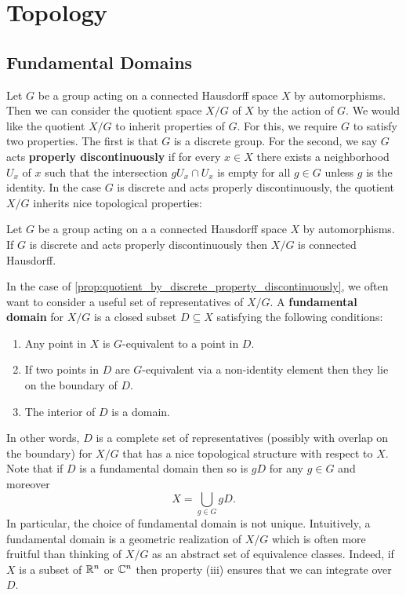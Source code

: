 \chapter{Topology}
  \section{Fundamental Domains}\label{append:Fundamental_Domains}
    Let $G$ be a group acting on a connected Hausdorff space $X$ by automorphisms. Then we can consider the quotient space $X/G$ of $X$ by the action of $G$. We would like the quotient $X/G$ to inherit properties of $G$. For this, we require $G$ to satisfy two properties. The first is that $G$ is a discrete group. For the second, we say $G$ acts \textbf{properly discontinuously} if for every $x \in X$ there exists a neighborhood $U_{x}$ of $x$ such that the intersection $gU_{x} \cap U_{x}$ is empty for all $g \in G$ unless $g$ is the identity. In the case $G$ is discrete and acts properly discontinuously, the quotient $X/G$ inherits nice topological properties:

    \begin{proposition}\label{prop:quotient_by_discrete_property_discontinuously}
      Let $G$ be a group acting on a a connected Hausdorff space $X$ by automorphisms. If $G$ is discrete and acts properly discontinuously then $X/G$ is connected Hausdorff.
    \end{proposition}

    In the case of \cref{prop:quotient_by_discrete_property_discontinuously}, we often want to consider a useful set of representatives of $X/G$. A \textbf{fundamental domain} for $X/G$ is a closed subset $D \subseteq X$ satisfying the following conditions:
      \begin{enumerate}[label=(\roman*)]
        \item Any point in $X$ is $G$-equivalent to a point in $D$.
        \item If two points in $D$ are $G$-equivalent via a non-identity element then they lie on the boundary of $D$.
        \item The interior of $D$ is a domain.
      \end{enumerate}
      In other words, $D$ is a complete set of representatives (possibly with overlap on the boundary) for $X/G$ that has a nice topological structure with respect to $X$. Note that if $D$ is a fundamental domain then so is $gD$ for any $g \in G$ and moreover
      \[
        X = \bigcup_{g \in G}gD.
      \]
      In particular, the choice of fundamental domain is not unique. Intuitively, a fundamental domain is a geometric realization of $X/G$ which is often more fruitful than thinking of $X/G$ as an abstract set of equivalence classes. Indeed, if $X$ is a subset of $\mathbb{R}^{n}$ or $\mathbb{C}^{n}$ then property (iii) ensures that we can integrate over $D$.
